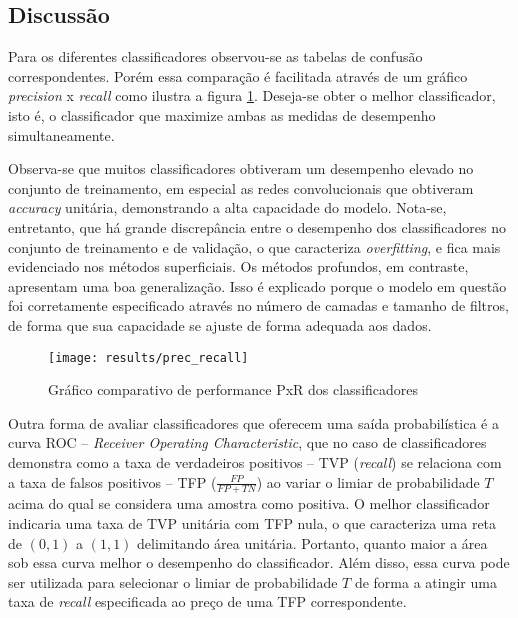 \subsection{Discussão}
Para os diferentes classificadores observou-se as tabelas de confusão correspondentes. Porém essa comparação é facilitada através de um gráfico \textit{precision} x \textit{recall} como ilustra a figura \ref{fig:classifiers-results}. Deseja-se obter o melhor classificador, isto é, o classificador que maximize ambas as medidas de desempenho simultaneamente. 

Observa-se que muitos classificadores obtiveram um desempenho elevado no conjunto de treinamento, em especial as redes convolucionais que obtiveram \textit{accuracy} unitária, demonstrando a alta capacidade do modelo. Nota-se, entretanto, que há grande discrepância entre o desempenho dos classificadores no conjunto de treinamento e de validação, o que caracteriza \textit{overfitting}, e fica mais evidenciado nos métodos superficiais. Os métodos profundos, em contraste, apresentam uma boa generalização. Isso é explicado porque o modelo em questão foi corretamente especificado através no número de camadas e tamanho de filtros, de forma que sua capacidade se ajuste de forma adequada aos dados.

\begin{figure}[h]
\centering
\texttt{[image: results/prec\_recall]}
\caption{Gráfico comparativo de performance PxR dos classificadores}
\label{fig:classifiers-results}
\end{figure}

Outra forma de avaliar classificadores que oferecem uma saída probabilística é a curva ROC -- \textit{Receiver Operating Characteristic}, que no caso de classificadores demonstra como a taxa de verdadeiros positivos -- TVP (\textit{recall}) se relaciona com a taxa de falsos positivos -- TFP ($\frac{FP}{FP+TN}$) ao variar o limiar de probabilidade $T$ acima do qual se considera uma amostra como positiva. O melhor classificador indicaria uma taxa de TVP unitária com TFP nula, o que caracteriza uma reta de $(0,1)$ a $(1,1)$ delimitando área unitária. Portanto, quanto maior a área sob essa curva melhor o desempenho do classificador. Além disso, essa curva pode ser utilizada para selecionar o limiar de probabilidade $T$ de forma a atingir uma taxa de \textit{recall} especificada ao preço de uma TFP correspondente.


